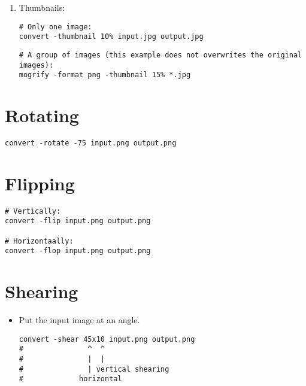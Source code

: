 \begin{enumerate}
\item Thumbnails:

\begin{lstlisting}
# Only one image:
convert -thumbnail 10% input.jpg output.jpg
\end{lstlisting}

\begin{lstlisting}
# A group of images (this example does not overwrites the original images):
mogrify -format png -thumbnail 15% *.jpg
\end{lstlisting}


\end{enumerate}


\section{Rotating}

\begin{lstlisting}
convert -rotate -75 input.png output.png
\end{lstlisting}


\section{Flipping}

\begin{lstlisting}
# Vertically:
convert -flip input.png output.png

# Horizontaally:
convert -flop input.png output.png
\end{lstlisting}


\section{Shearing}

\begin{itemize}
\item Put the input image at an angle.

\begin{lstlisting}
convert -shear 45x10 input.png output.png
#               ^  ^
#               |  |
#               | vertical shearing
#             horizontal
\end{lstlisting}
\end{itemize}


